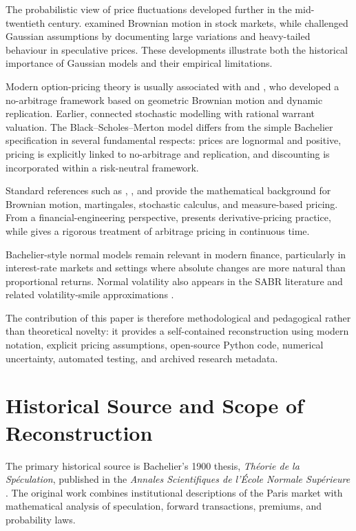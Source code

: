 \documentclass[11pt,a4paper]{article}
\begin{document}
The probabilistic view of price fluctuations developed further in the mid-twentieth century. \citet{osborne1959} examined Brownian motion in stock markets, while \citet{mandelbrot1963} challenged Gaussian assumptions by documenting large variations and heavy-tailed behaviour in speculative prices. These developments illustrate both the historical importance of Gaussian models and their empirical limitations.

Modern option-pricing theory is usually associated with \citet{blackscholes1973} and \citet{merton1973}, who developed a no-arbitrage framework based on geometric Brownian motion and dynamic replication. Earlier, \citet{samuelson1965} connected stochastic modelling with rational warrant valuation. The Black--Scholes--Merton model differs from the simple Bachelier specification in several fundamental respects: prices are lognormal and positive, pricing is explicitly linked to no-arbitrage and replication, and discounting is incorporated within a risk-neutral framework.

Standard references such as \citet{feller1968}, \citet{karatzas1998}, and \citet{shreve2004} provide the mathematical background for Brownian motion, martingales, stochastic calculus, and measure-based pricing. From a financial-engineering perspective, \citet{hull2018} presents derivative-pricing practice, while \citet{bjork2009} gives a rigorous treatment of arbitrage pricing in continuous time.

Bachelier-style normal models remain relevant in modern finance, particularly in interest-rate markets and settings where absolute changes are more natural than proportional returns. Normal volatility also appears in the SABR literature and related volatility-smile approximations \citep{hagan2002}.

The contribution of this paper is therefore methodological and pedagogical rather than theoretical novelty: it provides a self-contained reconstruction using modern notation, explicit pricing assumptions, open-source Python code, numerical uncertainty, automated testing, and archived research metadata.

\section{Historical Source and Scope of Reconstruction}

The primary historical source is Bachelier's 1900 thesis, \emph{Th\'eorie de la Sp\'eculation}, published in the \emph{Annales Scientifiques de l'\'Ecole Normale Sup\'erieure} \citep{bachelier1900}. The original work combines institutional descriptions of the Paris market with mathematical analysis of speculation, forward transactions, premiums, and probability laws.
\end{document}
